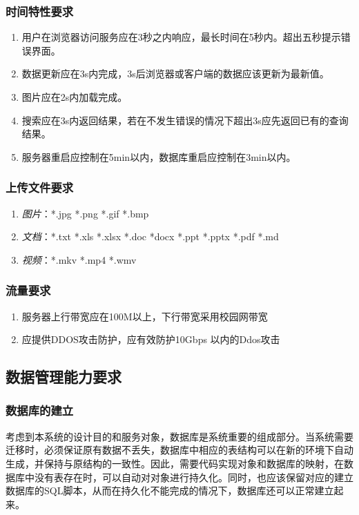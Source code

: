 \documentclass[UTF8]{ctexart}
\begin{document}
\subsubsection{时间特性要求}
\begin{enumerate}[1)]
\item 用户在浏览器访问服务应在3秒之内响应，最长时间在5秒内。超出五秒提示错误界面。
\item 数据更新应在3s内完成，3s后浏览器或客户端的数据应该更新为最新值。
\item 图片应在2s内加载完成。
\item 搜索应在3s内返回结果，若在不发生错误的情况下超出3s应先返回已有的查询结果。
\item 服务器重启应控制在5min以内，数据库重启应控制在3min以内。
\end{enumerate}

\subsubsection{上传文件要求}
\begin{enumerate}[1)]
\item \emph{图片}：*.jpg  *.png  *.gif   *.bmp
\item \emph{文档}：*.txt   *.xls    *.xlsx  *.doc  *docx  *.ppt  *.pptx  *.pdf  *.md
\item \emph{视频}：*.mkv  *.mp4  *.wmv
\end{enumerate}

\subsubsection{流量要求}
\begin{enumerate}[1)]
\item 服务器上行带宽应在100M以上，下行带宽采用校园网带宽
\item 应提供DDOS攻击防护，应有效防护10Gbps 以内的Ddos攻击
\end{enumerate}

\subsection{数据管理能力要求}
\subsubsection*{数据库的建立}
考虑到本系统的设计目的和服务对象，数据库是系统重要的组成部分。当系统需要迁移时，必须保证原有数据不丢失，数据库中相应的表结构可以在新的环境下自动生成，并保持与原结构的一致性。因此，需要代码实现对象和数据库的映射，在数据库中没有表存在时，可以自动对对象进行持久化。同时，也应该保留对应的建立数据库的SQL脚本，从而在持久化不能完成的情况下，数据库还可以正常建立起来。
\end{document}
